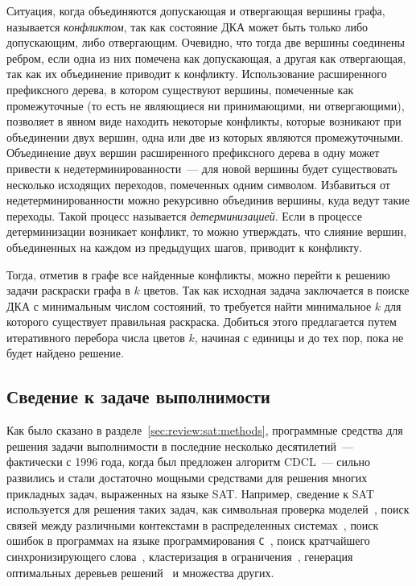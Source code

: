 Ситуация, когда объединяются допускающая и отвергающая вершины графа, называется \emph{конфликтом}, так как состояние ДКА может быть только либо допускающим, либо отвергающим.
Очевидно, что тогда две вершины соединены ребром, если одна из них помечена как допускающая, а другая как отвергающая, так как их объединение приводит к конфликту.
Использование расширенного префиксного дерева, в котором существуют вершины, помеченные как промежуточные (то есть не являющиеся ни принимающими, ни отвергающими), позволяет в явном виде находить некоторые конфликты, которые возникают при объединении двух вершин, одна или две из которых являются промежуточными.
Объединение двух вершин расширенного префиксного дерева в одну может привести к недетерминированности~--- для новой вершины будет существовать несколько исходящих переходов, помеченных одним символом.
Избавиться от недетерминированности можно рекурсивно объединив вершины, куда ведут такие переходы.
Такой процесс называется \emph{детерминизацией}.
Если в процессе детерминизации возникает конфликт, то можно утверждать, что слияние вершин, объединенных на каждом из предыдущих шагов, приводит к конфликту.

Тогда, отметив в графе все найденные конфликты, можно перейти к решению задачи раскраски графа в $k$ цветов.
Так как исходная задача заключается в поиске ДКА с минимальным числом состояний, то требуется найти минимальное $k$ для которого существует правильная раскраска.
Добиться этого предлагается путем итеративного перебора числа цветов $k$, начиная с единицы и до тех пор, пока не будет найдено решение.


\subsection{Сведение к задаче выполнимости}
\label{sec:review:sat-dfa-inf:sat}

Как было сказано в разделе~\ref{sec:review:sat:methods}, программные средства для решения задачи выполнимости в последние несколько десятилетий~--- фактически с 1996 года, когда был предложен алгоритм CDCL~--- сильно развились и стали достаточно мощными средствами для решения многих прикладных задач, выраженных на языке SAT.
Например, сведение к SAT используется для решения таких задач, как символьная проверка моделей~\cite{DBLP:conf/tacas/BiereCCZ99}, поиск связей между различными контекстами в распределенных системах~\cite{DBLP:conf/context/BouquetMSZ03}, поиск ошибок в программах на языке программирования \texttt{C}~\cite{DBLP:conf/cav/XieA05}, поиск кратчайшего синхронизирующего слова~\cite{DBLP:conf/wia/SkvortsovT11}, кластеризация в ограничения~\cite{DBLP:conf/ida/MetivierBCKL12}, генерация оптимальных деревьев решений~\cite{DBLP:conf/ijcai/NarodytskaIPM18} и множества других.

